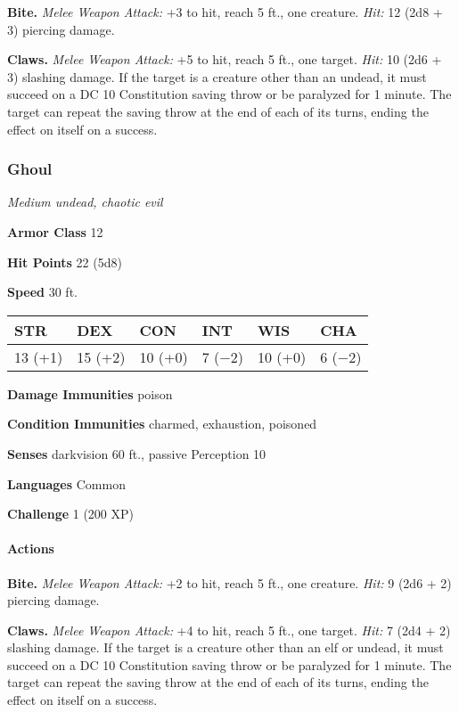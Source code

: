 \documentclass[
]{article}
\begin{document}
\textbf{Bite.} \emph{Melee Weapon Attack:} +3 to hit, reach 5 ft., one
creature. \emph{Hit:} 12 (2d8 + 3) piercing damage.

\textbf{Claws.} \emph{Melee Weapon Attack:} +5 to hit, reach 5 ft., one
target. \emph{Hit:} 10 (2d6 + 3) slashing damage. If the target is a
creature other than an undead, it must succeed on a DC 10 Constitution
saving throw or be paralyzed for 1 minute. The target can repeat the
saving throw at the end of each of its turns, ending the effect on
itself on a success.

\hypertarget{ghoul}{%
\subsubsection{Ghoul}\label{ghoul}}

\emph{Medium undead, chaotic evil}

\textbf{Armor Class} 12

\textbf{Hit Points} 22 (5d8)

\textbf{Speed} 30 ft.

\begin{longtable}[]{@{}llllll@{}}
\toprule
STR & DEX & CON & INT & WIS & CHA\tabularnewline
\midrule
\endhead
13 (+1) & 15 (+2) & 10 (+0) & 7 (−2) & 10 (+0) & 6 (−2)\tabularnewline
\bottomrule
\end{longtable}

\textbf{Damage Immunities} poison

\textbf{Condition Immunities} charmed, exhaustion, poisoned

\textbf{Senses} darkvision 60 ft., passive Perception 10

\textbf{Languages} Common

\textbf{Challenge} 1 (200 XP)

\hypertarget{actions-5}{%
\paragraph{Actions}\label{actions-5}}

\textbf{Bite.} \emph{Melee Weapon Attack:} +2 to hit, reach 5 ft., one
creature. \emph{Hit:} 9 (2d6 + 2) piercing damage.

\textbf{Claws.} \emph{Melee Weapon Attack:} +4 to hit, reach 5 ft., one
target. \emph{Hit:} 7 (2d4 + 2) slashing damage. If the target is a
creature other than an elf or undead, it must succeed on a DC 10
Constitution saving throw or be paralyzed for 1 minute. The target can
repeat the saving throw at the end of each of its turns, ending the
effect on itself on a success.
\end{document}
